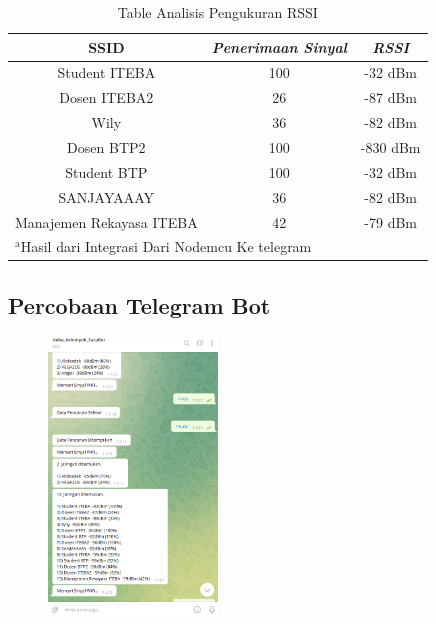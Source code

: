 \documentclass[conference]{IEEEtran}
\begin{document}
 \begin{table}[htbp]
    \caption{Table Analisis Pengukuran RSSI}
    \begin{center}
    \begin{tabular}{|c|c|c|}
        \hline
    \textbf{SSID} &  \textbf{\textit{Penerimaan Sinyal}}& \textbf{\textit{RSSI}} \\
    \hline
    Student ITEBA & 100 & -32 dBm   \\
    \hline
    Dosen ITEBA2 & 26 & -87 dBm   \\
    \hline
    Wily & 36 & -82 dBm   \\
    \hline
    Dosen BTP2  & 100 & -830 dBm   \\
    \hline
    Student BTP  & 100 & -32 dBm   \\
    \hline
    SANJAYAAAY   & 36 & -82 dBm   \\
    \hline
    Manajemen Rekayasa ITEBA  & 42 & -79 dBm   \\
    \hline

    \multicolumn{3}{l}{$^{\mathrm{a}}$Hasil dari Integrasi Dari Nodemcu Ke telegram}
    \end{tabular}
    \label{tab1}
    \end{center}
    \end{table}


    \subsection{Percobaan Telegram Bot}
    \begin{figure}[h]
        \centering
        \includegraphics[width=0.4\textwidth]{telegram.png}
    \end{figure}
\end{document}
